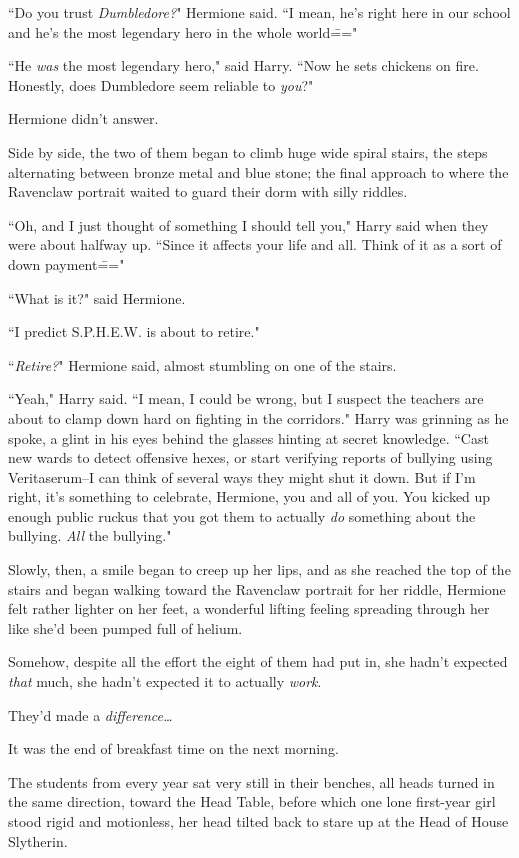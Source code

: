 ``Do you trust \emph{Dumbledore?}" Hermione said. ``I mean, he's right here in our school and he's the most legendary hero in the whole world\==="

``He \emph{was} the most legendary hero," said Harry. ``Now he sets chickens on fire. Honestly, does Dumbledore seem reliable to \emph{you}?"

Hermione didn't answer.

Side by side, the two of them began to climb huge wide spiral stairs, the steps alternating between bronze metal and blue stone; the final approach to where the Ravenclaw portrait waited to guard their dorm with silly riddles.

``Oh, and I just thought of something I should tell you," Harry said when they were about halfway up. ``Since it affects your life and all. Think of it as a sort of down payment\==="

``What is it?" said Hermione.

``I predict S.P.H.E.W. is about to retire."

``\emph{Retire?}" Hermione said, almost stumbling on one of the stairs.

``Yeah," Harry said. ``I mean, I could be wrong, but I suspect the teachers are about to clamp down hard on fighting in the corridors." Harry was grinning as he spoke, a glint in his eyes behind the glasses hinting at secret knowledge. ``Cast new wards to detect offensive hexes, or start verifying reports of bullying using Veritaserum\---I can think of several ways they might shut it down. But if I'm right, it's something to celebrate, Hermione, you and all of you. You kicked up enough public ruckus that you got them to actually \emph{do} something about the bullying. \emph{All} the bullying."

Slowly, then, a smile began to creep up her lips, and as she reached the top of the stairs and began walking toward the Ravenclaw portrait for her riddle, Hermione felt rather lighter on her feet, a wonderful lifting feeling spreading through her like she'd been pumped full of helium.

Somehow, despite all the effort the eight of them had put in, she hadn't expected \emph{that} much, she hadn't expected it to actually \emph{work}.

They'd made a \emph{difference{\ldots}}

\later

It was the end of breakfast time on the next morning.

The students from every year sat very still in their benches, all heads turned in the same direction, toward the Head Table, before which one lone first-year girl stood rigid and motionless, her head tilted back to stare up at the Head of House Slytherin.

